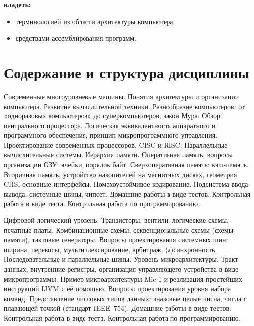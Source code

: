 \noindent\textbf{владеть:}
	\begin{itemize}[topsep=1mm]
		\item терминологией из области архитектуры компьютера,
		\item средствами ассемблирования программ.
	\end{itemize}

\section{Содержание и структура дисциплины}
	







\myunit
	{Современные многоуровневые машины. Понятия архитектуры и организации компьютера. Развитие вычислительной техники. Разнообразие компьютеров: от «одноразовых компьютеров» до суперкомпьютеров, закон Мура. Обзор центрального процессора. Логическая эквивалентность аппаратного и программного обеспечения, принцип микропрограммного управления. Проектирование современных процессоров, CISC и RISC. Параллельные вычислительные системы. 
	Иерархия памяти. Оперативная память, вопросы организации ОЗУ: ячейки, порядок байт. Сверхоперативная память: кэш-память. 
	Вторичная память, устройство накопителей на магнитных дисках, геометрия CHS, основные интерфейсы. Помехоустойчивое кодирование. 
	Подсистема ввода-вывода, системные шины, чипсет.}
	{Домашние работы в виде тестов. Контрольная работа в виде теста. Контрольная работа по программированию.}

\myunit
	{Цифровой логический уровень. Транзисторы, вентили, логические схемы, печатные платы. Комбинационные схемы, секвенциональные схемы (схемы памяти), тактовые генераторы. Вопросы проектирования системных шин: ширина, перекосы, мультиплексирование, арбитраж, (а)синхронность. Последовательные и параллельные шины.
	Уровень микроархитектуры. Тракт данных, внутренние регистры, организация управляющего устройства в виде микропрограммы. Пример микроархитектуры Mic-1 и реализация простейших инструкций IJVM с её помощью.
	Вопросы проектирования уровня набора команд. Представление числовых типов данных: знаковые целые числа, числа с плавающей точкой (стандарт IEEE~754).}
	{Домашние работы в виде тестов. Контрольная работа в виде теста.
	Контрольная работа по программированию.}

